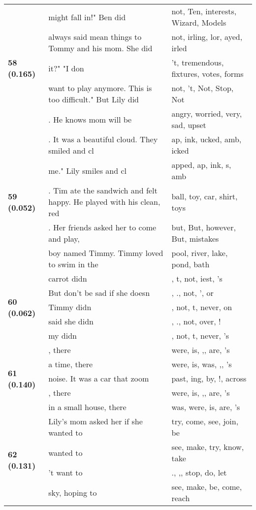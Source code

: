 \documentclass{article}
\begin{document}
\begin{adjustbox}{max width=\textwidth}
\begin{tabular}{p{} p{} p{}}
\midrule
\multirow{5}{*}{\textbf{58 (0.165)}} & might fall in!"  Ben did & not, Ten,  interests,  Wizard,  Models \\
 & always said mean things to Tommy and his mom. She did & not, irling, lor, ayed, irled \\
 & it?"  "I don & 't,  tremendous,  fixtures,  votes,  forms \\
 & want to play anymore. This is too difficult." But Lily did & not, 't,  Not, Stop, Not \\
 & . He knows mom will be & angry,  worried,  very,  sad,  upset \\
\midrule
\multirow{5}{*}{\textbf{59 (0.052)}} & . It was a beautiful cloud. They smiled and cl & ap, ink, ucked, amb, icked \\
 & me."  Lily smiles and cl & apped, ap, ink, s, amb \\
 & . Tim ate the sandwich and felt happy. He played with his clean, red & ball,  toy,  car,  shirt,  toys \\
 & .  Her friends asked her to come and play, & but,  But,  however, But,  mistakes \\
 & boy named Timmy. Timmy loved to swim in the & pool,  river,  lake,  pond,  bath \\
\midrule
\multirow{5}{*}{\textbf{60 (0.062)}} & carrot didn & , t,  not, iest, 's \\
 & But don't be sad if she doesn & , .,  not, ',  or \\
 & Timmy didn & ,  not, t,  never, on \\
 & said she didn & , .,  not,  over, ! \\
 & my didn & ,  not, t,  never, 's \\
\midrule
\multirow{5}{*}{\textbf{61 (0.140)}} & , there & were,  is, ,,  are, 's \\
 & a time, there & were,  is,  was, ,, 's \\
 & noise. It was a car that zoom & past, ing,  by, !,  across \\
 & , there & were,  is, ,,  are, 's \\
 & in a small house, there & was,  were,  is,  are, 's \\
\midrule
\multirow{5}{*}{\textbf{62 (0.131)}} & Lily's mom asked her if she wanted to & try,  come,  see,  join,  be \\
 & wanted to & see,  make,  try,  know,  take \\
 & 't want to & ., ,,  stop,  do,  let \\
 & sky, hoping to & see,  make,  be,  come,  reach \\

\end{tabular}
\end{adjustbox}
\end{document}
